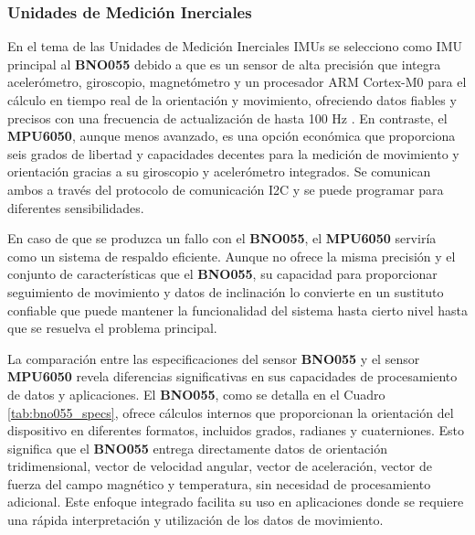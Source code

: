        \subsubsection{ Unidades de Medición    Inerciales}\vspace{5px}

            En el tema de las Unidades de Medición Inerciales IMUs se selecciono como IMU principal al \textbf{BNO055} debido a que es un sensor de alta precisión que integra acelerómetro, giroscopio, magnetómetro y un procesador ARM Cortex-M0 para el cálculo en tiempo real de la orientación y movimiento, ofreciendo datos fiables y precisos con una frecuencia de actualización de hasta 100 Hz \cite{IMU}. En contraste, el \textbf{MPU6050}, aunque menos avanzado, es una opción económica que proporciona seis grados de libertad y capacidades decentes para la medición de movimiento y orientación gracias a su giroscopio y acelerómetro integrados. Se comunican ambos a través del protocolo de comunicación I2C y se puede programar para diferentes sensibilidades.\cite{BNO} \vspace{5px}
            
            
            
            En caso de que se produzca un fallo con el \textbf{BNO055}, el \textbf{MPU6050} serviría como un sistema de respaldo eficiente. Aunque no ofrece la misma precisión y el conjunto de características que el \textbf{BNO055}, su capacidad para proporcionar seguimiento de movimiento y datos de inclinación lo convierte en un sustituto confiable que puede mantener la funcionalidad del sistema hasta cierto nivel hasta que se resuelva el problema principal. \vspace{5px}

            La comparación entre las especificaciones del sensor \textbf{BNO055} y el sensor \textbf{MPU6050} revela diferencias significativas en sus capacidades de procesamiento de datos y aplicaciones. El \textbf{BNO055}, como se detalla en el Cuadro \ref{tab:bno055_specs}, ofrece cálculos internos que proporcionan la orientación del dispositivo en diferentes formatos, incluidos grados, radianes y cuaterniones. Esto significa que el \textbf{BNO055} entrega directamente datos de orientación tridimensional, vector de velocidad angular, vector de aceleración, vector de fuerza del campo magnético y temperatura, sin necesidad de procesamiento adicional. Este enfoque integrado facilita su uso en aplicaciones donde se requiere una rápida interpretación y utilización de los datos de movimiento.  \vspace{5px} 
            
